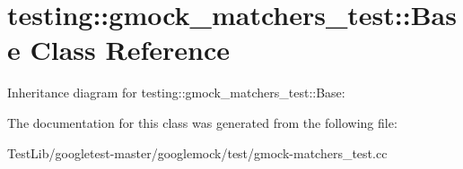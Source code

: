 \hypertarget{classtesting_1_1gmock__matchers__test_1_1Base}{}\section{testing\+:\+:gmock\+\_\+matchers\+\_\+test\+:\+:Base Class Reference}
\label{classtesting_1_1gmock__matchers__test_1_1Base}


Inheritance diagram for testing\+:\+:gmock\+\_\+matchers\+\_\+test\+:\+:Base\+:


The documentation for this class was generated from the following file\+:\begin{DoxyCompactItemize}
\item 
Test\+Lib/googletest-\/master/googlemock/test/gmock-\/matchers\+\_\+test.\+cc\end{DoxyCompactItemize}
